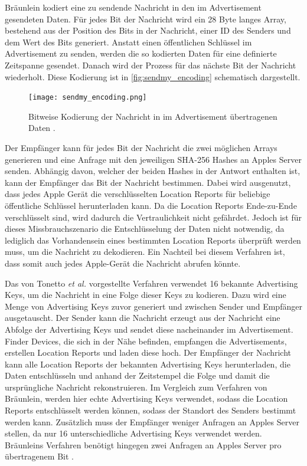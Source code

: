 Bräunlein \cite{braeunlein_sendmy} kodiert eine zu sendende Nachricht in den im Advertisement gesendeten Daten.
Für jedes Bit der Nachricht wird ein 28 Byte langes Array, bestehend aus der Position des Bits in der Nachricht, einer ID des Senders und dem Wert des Bits generiert.
Anstatt einen öffentlichen Schlüssel im Advertisement zu senden, werden die so kodierten Daten für eine definierte Zeitspanne gesendet.
Danach wird der Prozess für das nächste Bit der Nachricht wiederholt.
Diese Kodierung ist in \autoref{fig:sendmy_encoding} schematisch dargestellt.
\begin{figure}[ht]
  \centering
  \texttt{[image: sendmy\_encoding.png]}
  \caption{Bitweise Kodierung der Nachricht in im Advertisement übertragenen Daten \cite{braeunlein_sendmy}.}
  \label{fig:sendmy_encoding}
\end{figure}
Der Empfänger kann für jedes Bit der Nachricht die zwei möglichen Arrays generieren und eine Anfrage mit den jeweiligen \ac{SHA}-256 Hashes an Apples Server senden.
Abhängig davon, welcher der beiden Hashes in der Antwort enthalten ist, kann der Empfänger das Bit der Nachricht bestimmen.
Dabei wird ausgenutzt, dass jedes Apple Gerät die verschlüsselten Location Reports für beliebige öffentliche Schlüssel herunterladen kann.
Da die Location Reports Ende-zu-Ende verschlüsselt sind, wird dadurch die Vertraulichkeit nicht gefährdet.
Jedoch ist für dieses Missbrauchszenario die Entschlüsselung der Daten nicht notwendig, da lediglich das Vorhandensein eines bestimmten Location Reports überprüft werden muss, um die Nachricht zu dekodieren.
Ein Nachteil bei diesem Verfahren ist, dass somit auch jedes Apple-Gerät die Nachricht abrufen könnte.


Das von Tonetto \textit{et al.} \cite{Tonetto_FindMy} vorgestellte Verfahren verwendet 16 bekannte Advertising Keys, um die Nachricht in eine Folge dieser Keys zu kodieren.
Dazu wird eine Menge von Advertising Keys zuvor generiert und zwischen Sender und Empfänger ausgetauscht.
Der Sender kann die Nachricht erzeugt aus der Nachricht eine Abfolge der Advertising Keys und sendet diese nacheinander im Advertisement.
Finder Devices, die sich in der Nähe befinden, empfangen die Advertisements, erstellen Location Reports und laden diese hoch.
Der Empfänger der Nachricht kann alle Location Reports der bekannten Advertising Keys herunterladen, die Daten entschlüsseln und anhand der Zeitstempel die Folge und damit die ursprüngliche Nachricht rekonstruieren.
Im Vergleich zum Verfahren von Bräunlein, werden hier echte Advertising Keys verwendet, sodass die Location Reports entschlüsselt werden können, sodass der Standort des Senders bestimmt werden kann.
Zusätzlich muss der Empfänger weniger Anfragen an Apples Server stellen, da nur 16 unterschiedliche Advertising Keys verwendet werden.
Bräunleins Verfahren benötigt hingegen zwei Anfragen an Apples Server pro übertragenem Bit \cite{braeunlein_sendmy}.


